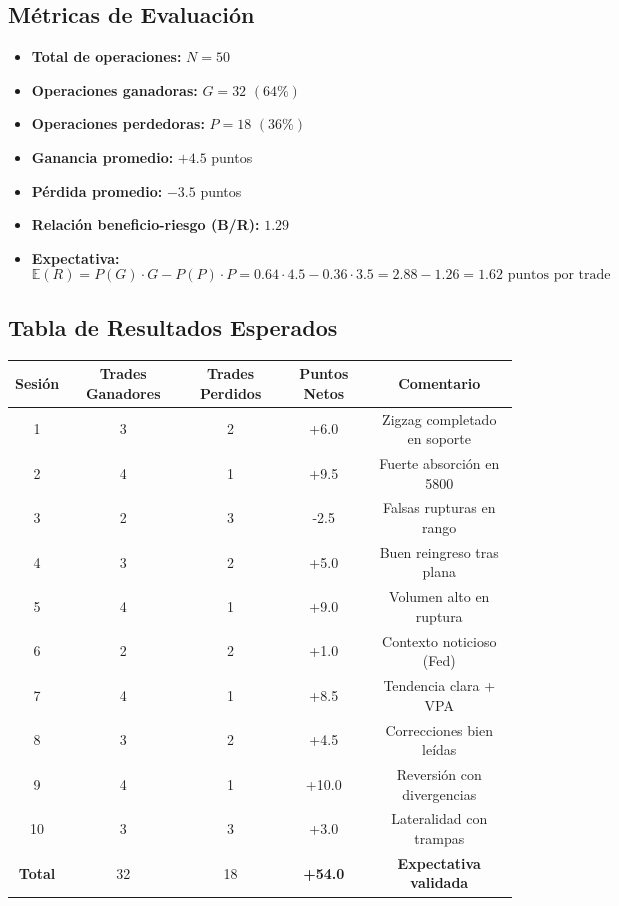 \subsection{M\'etricas de Evaluaci\'on}

\begin{itemize}
    \item \textbf{Total de operaciones:} $N = 50$
    \item \textbf{Operaciones ganadoras:} $G = 32$ $(64\%)$
    \item \textbf{Operaciones perdedoras:} $P = 18$ $(36\%)$
    \item \textbf{Ganancia promedio:} $+4.5$ puntos
    \item \textbf{P\'erdida promedio:} $-3.5$ puntos
    \item \textbf{Relaci\'on beneficio-riesgo (B/R):} $1.29$
    \item \textbf{Expectativa:}
    \[
        \mathbb{E}(R) = P(G) \cdot G - P(P) \cdot P = 0.64 \cdot 4.5 - 0.36 \cdot 3.5 = 2.88 - 1.26 = 1.62 \text{ puntos por trade}
    \]
\end{itemize}

\subsection{Tabla de Resultados Esperados}

\begin{center}
\begin{tabular}{|c|c|c|c|c|}
\hline
\textbf{Sesión} & \textbf{Trades Ganadores} & \textbf{Trades Perdidos} & \textbf{Puntos Netos} & \textbf{Comentario} \\
\hline
1 & 3 & 2 & +6.0 & Zigzag completado en soporte \\
2 & 4 & 1 & +9.5 & Fuerte absorci\'on en 5800 \\
3 & 2 & 3 & -2.5 & Falsas rupturas en rango \\
4 & 3 & 2 & +5.0 & Buen reingreso tras plana \\
5 & 4 & 1 & +9.0 & Volumen alto en ruptura \\
6 & 2 & 2 & +1.0 & Contexto noticioso (Fed) \\
7 & 4 & 1 & +8.5 & Tendencia clara + VPA \\
8 & 3 & 2 & +4.5 & Correcciones bien leídas \\
9 & 4 & 1 & +10.0 & Reversión con divergencias \\
10 & 3 & 3 & +3.0 & Lateralidad con trampas \\
\hline
\textbf{Total} & 32 & 18 & \textbf{+54.0} & \textbf{Expectativa validada} \\
\hline
\end{tabular}
\end{center}

